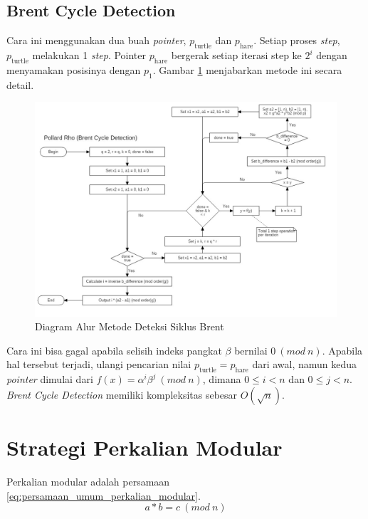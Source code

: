 \subsection{Brent Cycle Detection}
Cara ini menggunakan dua buah \textit{pointer}, $ p_{\text{turtle}} $ dan $ p_{\text{hare}} $. Setiap proses \textit{step}, $ p_{\text{turtle}} $ melakukan 1 \textit{step}. Pointer $ p_{\text{hare}} $ bergerak setiap iterasi step ke $ 2^i $ dengan menyamakan posisinya dengan $ p_1 $. Gambar \ref{fig:brent_pollard_rho} menjabarkan metode ini secara detail.
\begin{figure}[h!]
	\Centering
	\includegraphics[scale=0.4,angle=90]{bab2/img/pollard-rho-brent}
	\caption {Diagram Alur Metode Deteksi Siklus Brent}
	\label{fig:brent_pollard_rho}
\end{figure}

Cara ini bisa gagal apabila selisih indeks pangkat $ \beta $ bernilai $ 0\ (mod\ n) $. Apabila hal tersebut terjadi, ulangi pencarian nilai $ p_{\text{turtle}} = p_{\text{hare}} $ dari awal, namun kedua \textit{pointer} dimulai dari $ f(x)=\alpha^i \beta^j\ (mod\ n) $, dimana $ 0 \leq i < n $ dan $ 0 \leq j < n $. \textit{Brent Cycle Detection} memiliki kompleksitas sebesar $ O(\sqrt{n}) $.

\section{Strategi Perkalian Modular}

Perkalian modular adalah persamaan \eqref{eq:persamaan_umum_perkalian_modular}.
\begin{equation}
a*b=c\ (mod\ n)
\label{eq:persamaan_umum_perkalian_modular}
\end{equation}

